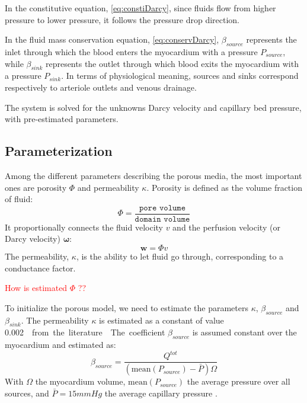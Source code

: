 \documentclass[journal]{IEEEtran}
\newcommand{\clcg}[1]{\textcolor{red}{#1}}
\begin{document}
In the constitutive equation, \ref{eq:constiDarcy}, since fluids flow from higher pressure to lower pressure, it follows the pressure drop direction. 

In the fluid mass conservation equation, \ref{eq:conservDarcy},  $\beta_{source}$ represents the inlet through which the blood enters the myocardium with a pressure $P_{source}$, while $\beta_{sink}$ represents the outlet through which blood exits the myocardium with a pressure $P_{sink}$. In terms of physiological meaning, sources and sinks  correspond respectively to arteriole outlets and venous drainage. 

The system is solved for the unknowns Darcy velocity and capillary bed pressure, with pre-estimated parameters.

\subsection{Parameterization}
Among the different parameters describing the porous media, the most important ones are porosity $\Phi$ and permeability $\kappa$.
Porosity is defined as the volume fraction of fluid:
\begin{equation}
\Phi = \frac{\texttt{pore volume}}{\texttt{domain volume}}
\end{equation}
It proportionally connects the fluid velocity $v$ and the perfusion velocity (or Darcy velocity) $\bm{\omega}$:
\begin{equation}
\bm{w} = \Phi v 
\end{equation}
The permeability, $\kappa$, is the ability to let fluid go through, corresponding to a conductance factor.

\clcg{How is estimated $\Phi$ ??}

To initialize the porous model, we need to estimate the parameters $\kappa$, $\beta_{source}$ and $\beta_{sink}$.
The permeability $\kappa$ is estimated as a constant of value \SI{0.002}{\milli\meter\square\per\pascal\per\second} from the literature \cite{chapelle2010poroelastic}. 

The coefficient $\beta_{source}$ is assumed constant over the myocardium and estimated as:
\begin{equation}
\beta_{source} = \frac{Q^{tot}}{(\text{mean}(P_{source}) - \bar{P}) \Omega}
\end{equation}
With $\Omega$ the myocardium volume, $\text{mean}(P_{source})$ the average pressure over all sources, and $\bar{P} = 15 mmHg$ the average capillary pressure \cite{chapelle2010poroelastic}.
\end{document}
